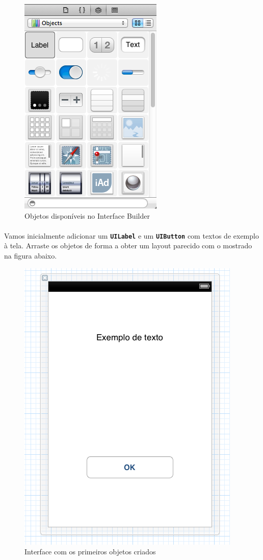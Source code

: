 \documentclass[a4paper,12pt,brazil,doubleside]{book}
\begin{document}
\begin{figure}[h]
  \centering
  \includegraphics[totalheight=0.25\textheight]{figuras/1/xib_objetos.png}
  \caption{Objetos disponíveis no Interface Builder}
  \label{fig:a}
\end{figure}

\paragraph{}Vamos inicialmente adicionar um \texttt{\textbf{UILabel}} e um \texttt{\textbf{UIButton}} com textos de exemplo à tela. Arraste os objetos de forma a obter um layout parecido com o mostrado na figura abaixo.

\begin{figure}[h]
  \centering
  \includegraphics[totalheight=0.3\textheight]{figuras/1/xib_tela1.png}
  \caption{Interface com os primeiros objetos criados}
  \label{fig:a}
\end{figure}
\end{document}
